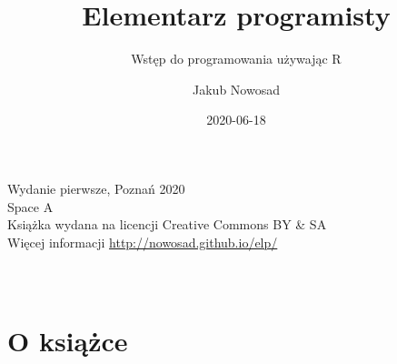 \documentclass[paper=6in:9in,pagesize=pdftex,headinclude=on,footinclude=on,10pt]{scrbook}
\title{Elementarz programisty}
\subtitle{Wstęp do programowania używając R}
\author{Jakub Nowosad}
\date{2020-06-18}
\let\oldmaketitle\maketitle
\begin{document}
\maketitle

\thispagestyle{empty}


\let\maketitle\oldmaketitle
\maketitle

\thispagestyle{empty}
\vspace*{\fill}
Wydanie pierwsze, Poznań 2020 \\
Space A \\
Książka wydana na licencji Creative Commons BY \& SA \\
Więcej informacji \url{http://nowosad.github.io/elp/} \\
\\
\\

{
\setcounter{tocdepth}{1}
\tableofcontents
}
\hypertarget{o-ksiux105ux17cce}{%
\chapter*{O książce}\label{o-ksiux105ux17cce}}
\end{document}
